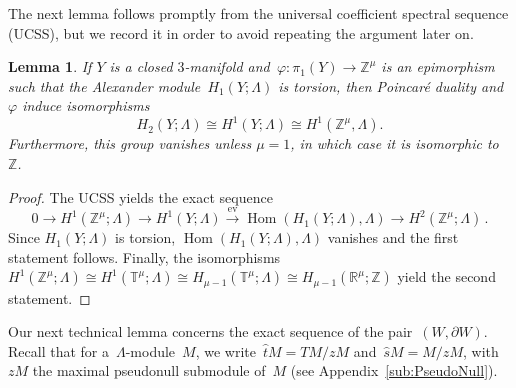 \documentclass[10.9pt,a4paper]{amsart}
\newtheorem{lemma}[theorem]{Lemma}
\theoremstyle{definition}
\theoremstyle{remark}
\newcommand{\Z}{\mathbb{Z}}
\newcommand{\ev}{\operatorname{ev}}
\newcommand{\Hom}{\operatorname{Hom}}
\newcommand{\that}{\hat{t}}
\newcommand{\shat}{\hat{s}}
\begin{document}
The next lemma follows promptly from the universal coefficient spectral sequence (UCSS), but we record it in order to avoid repeating the argument later on.
\begin{lemma}
\label{lem:H2Vanishes}
If $Y$ is a closed $3$-manifold and~$\varphi \colon \pi_1(Y) \to \Z^\mu$ is an epimorphism such that the Alexander module~$H_1(Y;\Lambda)$ is torsion, then Poincar\'e duality and $\varphi$ induce isomorphisms
$$ H_2(Y;\Lambda) \cong H^1(Y;\Lambda) \cong  H^1(\Z^\mu,\Lambda).$$
Furthermore, this group vanishes unless $\mu=1$, in which case it is isomorphic to $\Z$.
\end{lemma}
\begin{proof}
The UCSS yields the exact sequence 
$$ 
0 \to H^1(\Z^\mu;\Lambda) \to H^1(Y;\Lambda) \xrightarrow{\ev} \Hom(H_1(Y;\Lambda),\Lambda) \to H^2(\Z^\mu;\Lambda)\,.
$$
Since $H_1(Y;\Lambda)$ is torsion,  $\Hom(H_1(Y;\Lambda),\Lambda)$ vanishes and the first statement follows.
Finally, the isomorphisms~$H^1(\Z^\mu;\Lambda) \cong H^1(\mathbb{T}^\mu;\Lambda) \cong H_{\mu-1}(\mathbb{T}^\mu;\Lambda) \cong H_{\mu-1}(\mathbb{R}^\mu;\Z)$ yield the second statement.
\end{proof} 


Our next technical lemma concerns the exact sequence of the pair~$(W,\partial W)$.
Recall that for a~$\Lambda$-module~$M$, we write~$\that M=TM/zM$ and~$\shat M=M/zM$, with~$zM$ the maximal pseudonull submodule of~$M$ (see Appendix~\ref{sub:PseudoNull}).
\end{document}

